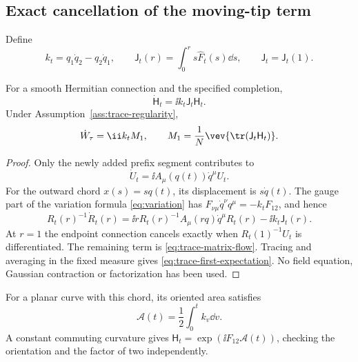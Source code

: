 \subsection{Exact cancellation of the moving-tip term}

Define
\begin{equation}\label{eq:trace-J}
 k_t=q_1\dot q_2-q_2\dot q_1,\qquad
 \mathsf J_t(r)=\int_0^r s\widehat F_t(s)\dd s,\qquad
 \mathsf J_t=\mathsf J_t(1).
\end{equation}

\begin{proposition}
\label{prop:trace-transport}
For a smooth Hermitian connection and the specified completion,
\begin{equation}\label{eq:trace-matrix-flow}
 \dot{\mathsf H}_t=\ii k_t\mathsf J_t\mathsf H_t.
\end{equation}
Under Assumption~\ref{ass:trace-regularity},
\begin{equation}\label{eq:trace-first-expectation}
 \dot W_\tau=\ii k_t M_1,\qquad
 M_1=\frac1N\vev{\tr(\mathsf J_t\mathsf H_t)}.
\end{equation}
\end{proposition}
\begin{proof}
Only the newly added prefix segment contributes to
\[
 \dot U_t=\ii A_\mu(q(t))\dot q^\mu U_t.
\]
For the outward chord $x(s)=s q(t)$, its displacement is
$s\dot q(t)$. The gauge part of the variation formula
\eqref{eq:variation} has
$F_{\nu\mu}\dot q^\nu q^\mu=-k_tF_{12}$, and hence
\begin{equation}\label{eq:trace-radial-variation}
 R_t(r)^{-1}\dot R_t(r)
 =\ii rR_t(r)^{-1}A_\mu(rq)\dot q^\mu R_t(r)
                                  -\ii k_t\mathsf J_t(r).
\end{equation}
At $r=1$ the endpoint connection cancels exactly when
$R_t(1)^{-1}U_t$ is differentiated. The remaining term is
\eqref{eq:trace-matrix-flow}. Tracing and averaging in the fixed
measure gives \eqref{eq:trace-first-expectation}. No field
equation, Gaussian contraction or factorization has been used.
\end{proof}

For a planar curve with this chord, its oriented area satisfies
\begin{equation}\label{eq:trace-area}
 \mathcal A(t)=\frac12\int_0^t k_v\dd v.
\end{equation}
A constant commuting curvature gives
$\mathsf H_t=\exp(\ii F_{12}\mathcal A(t))$, checking the
orientation and the factor of two independently.

